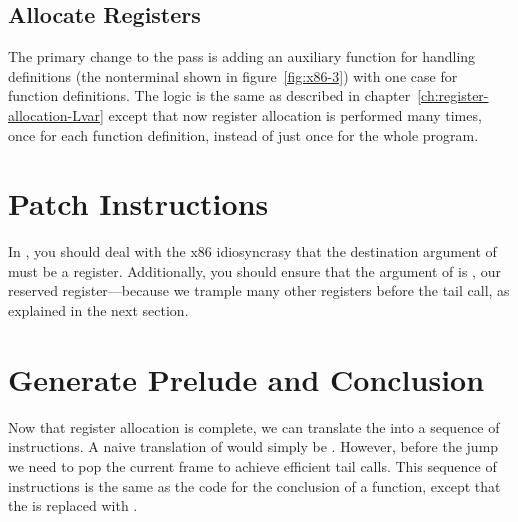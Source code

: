 \documentclass[7x10]{TimesAPriori_MIT}%
\numberwithin{theorem}{chapter}
\numberwithin{definition}{chapter}
\numberwithin{equation}{chapter}
\begin{document}
\subsection{Allocate Registers}

The primary change to the  pass is adding an
auxiliary function for handling definitions (the \Def{} nonterminal
shown in figure~\ref{fig:x86-3}) with one case for function
definitions. The logic is the same as described in
chapter~\ref{ch:register-allocation-Lvar} except that now register
allocation is performed many times, once for each function definition,
instead of just once for the whole program.


\section{Patch Instructions}

In , you should deal with the x86
idiosyncrasy that the destination argument of  must be a
register. Additionally, you should ensure that the argument of
 is , our reserved register---because we
trample many other registers before the tail call, as explained in the
next section.

\section{Generate Prelude and Conclusion}

Now that register allocation is complete, we can translate the
 into a sequence of instructions. A naive translation of
 would simply be .  However,
before the jump we need to pop the current frame to achieve efficient
tail calls.  This sequence of instructions is the same as the code for
the conclusion of a function, except that the  is replaced with
.
\end{document}
